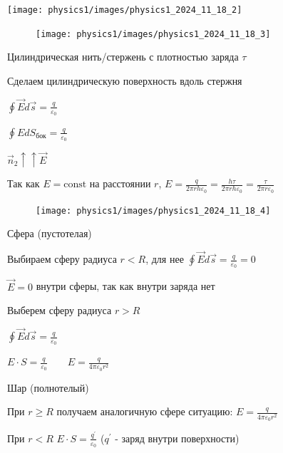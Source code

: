\documentclass[12pt]{article}
\begin{document}
    \begin{center}
        \texttt{[image: physics1/images/physics1\_2024\_11\_18\_2]}
    \end{center}

    \begin{minipage}{\textwidth}
        \begin{figure}
            \texttt{[image: physics1/images/physics1\_2024\_11\_18\_3]}
        \end{figure}

         Цилиндрическая нить/стержень с плотностью заряда $\tau$

        Сделаем цилиндрическую поверхность вдоль стержня

        $\oint \vec{E} d\vec{s} = \frac{q}{\varepsilon_0}$

        $\oint E dS_{\text{бок}} = \frac{q}{\varepsilon_0}$

        $\vec{n}_2 \uparrow\uparrow \vec{E}$ 

        Так как $E = \mathrm{const}$ на расстоянии $r$, $E = \frac{q}{2\pi r h \varepsilon_0} = \frac{h\tau}{2\pi r h \varepsilon_0} = \frac{\tau}{2\pi r \varepsilon_0}$
    \end{minipage}


    \begin{minipage}{\textwidth}
        \begin{figure}
            \texttt{[image: physics1/images/physics1\_2024\_11\_18\_4]}
        \end{figure}

         Сфера (пустотелая)

        Выбираем сферу радиуса $r < R$, для нее $\oint \vec{E} d\vec{s} = \frac{q}{\varepsilon_0} = 0$

        $\vec{E} = 0$ внутри сферы, так как внутри заряда нет

        Выберем сферу радиуса $r > R$

        $\oint \vec{E} d\vec{s} = \frac{q}{\varepsilon_0}$

        $E \cdot S = \frac{q}{\varepsilon_0} \qquad E = \frac{q}{4\pi \varepsilon_0 r^2}$    
    \end{minipage}

     Шар (полнотелый)

    При $r \geq R$ получаем аналогичную сфере ситуацию: $E = \frac{q}{4\pi \varepsilon_0 r^2}$

    При $r < R$ $E \cdot S = \frac{q^\prime}{\varepsilon_0}$ ($q^\prime$ - заряд внутри поверхности)
\end{document}
